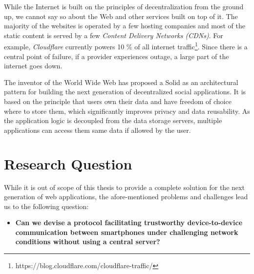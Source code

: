 While the Internet is built on the principles of decentralization from the ground up, we cannot say so about the Web and other services built on top of it. The majority of the websites is operated by a few hosting companies and most of the static content is served by a few \textit{Content Delivery Networks (CDNs)}. For example, \textit{Cloudflare} currently powers 10 \% of all internet traffic\footnote{https://blog.cloudflare.com/cloudflare-traffic/}. Since there is a central point of failure, if a provider experiences outage, a large part of the internet goes down.

The inventor of the World Wide Web has proposed a Solid \cite{solid} as an architectural pattern for building the next generation of decentralized social applications. It is based on the principle that users own their data and have freedom of choice where to store them, which significantly improves privacy and data reusability. As the application logic is decoupled from the data storage servers, multiple applications can access them same data if allowed by the user.

\newpage

\section{Research Question}

While it is out of scope of this thesis to provide a complete solution for the next generation of web applications, the afore-mentioned problems and challenges lead us to the following question:

\begin{itemize}
    \item \textbf{Can we devise a protocol facilitating trustworthy device-to-device communication between smartphones under challenging network conditions without using a central server?}
\end{itemize}

